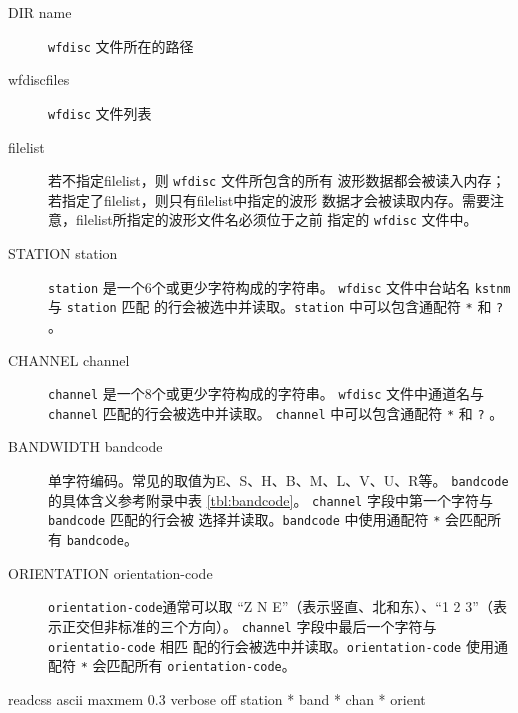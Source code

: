 \begin{description}
\item [DIR name] \texttt{wfdisc} 文件所在的路径
\item [wfdiscfiles] \texttt{wfdisc} 文件列表
\item [filelist] 若不指定filelist，则 \texttt{wfdisc} 文件所包含的所有
    波形数据都会被读入内存；若指定了filelist，则只有filelist中指定的波形
    数据才会被读取内存。需要注意，filelist所指定的波形文件名必须位于之前
    指定的 \texttt{wfdisc} 文件中。
\item[STATION station] \texttt{station} 是一个6个或更少字符构成的字符串。
    \texttt{wfdisc} 文件中台站名 \texttt{kstnm} 与 \texttt{station} 匹配
    的行会被选中并读取。\texttt{station} 中可以包含通配符 \texttt{*} 和
    \texttt{?} 。
\item[CHANNEL channel]  \texttt{channel} 是一个8个或更少字符构成的字符串。
    \texttt{wfdisc} 文件中通道名与 \texttt{channel} 匹配的行会被选中并读取。
    \texttt{channel} 中可以包含通配符 \texttt{*} 和 \texttt{?} 。
\item [BANDWIDTH bandcode] 单字符编码。常见的取值为E、S、H、B、M、L、V、U、R等。
    \texttt{bandcode} 的具体含义参考附录中表 \ref{tbl:bandcode}。
    \texttt{channel} 字段中第一个字符与 \texttt{bandcode} 匹配的行会被
    选择并读取。\texttt{bandcode} 中使用通配符 \texttt{*} 会匹配所有
    \texttt{bandcode}。
\item [ORIENTATION orientation-code] \texttt{orientation-code}通常可以取
    ``Z N E''（表示竖直、北和东）、``1 2 3''（表示正交但非标准的三个方向）。
    \texttt{channel} 字段中最后一个字符与 \texttt{orientatio-code} 相匹
    配的行会被选中并读取。\texttt{orientation-code} 使用通配符 \texttt{*}
    会匹配所有 \texttt{orientation-code}。
\end{description}

\begin{SACSTX}
readcss ascii maxmem 0.3 verbose off station * band * chan * orient
\end{SACSTX}

